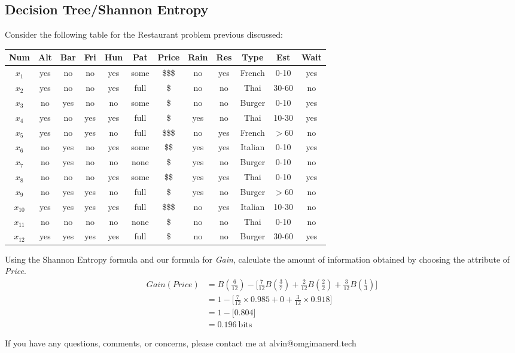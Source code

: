 \documentclass{math}
\begin{document}
\subsection*{Decision Tree/Shannon Entropy}
Consider the following table for the Restaurant problem previous discussed:
\begin{center}
 \begin{tabular}{|c|c|c|c|c|c|c|c|c|c|c||c|}
    \hline
    Num & Alt & Bar & Fri & Hun & Pat & Price & Rain & Res & Type & Est &
      Wait \\ \hline \hline
    \( x_{1} \) & yes & no & no & yes & some & \$\$\$ & no & yes & French &
      0-10 & yes \\ \hline
    \( x_{2} \) & yes & no & no & yes & full & \$ & no & no & Thai & 30-60 &
      no \\ \hline
    \( x_{3} \) & no & yes & no & no & some & \$ & no & no & Burger & 0-10 &
      yes \\ \hline
    \( x_{4} \) & yes & no & yes & yes & full & \$ & yes & no & Thai & 10-30 &
      yes \\ \hline \hline
    \( x_{5} \) & yes & no & yes & no & full & \$\$\$ & no & yes & French &
      $>$60 & no \\ \hline
    \( x_{6} \) & no & yes & no & yes & some & \$\$ & yes & yes & Italian &
      0-10 & yes \\ \hline
    \( x_{7} \) & no & yes & no & no & none & \$ & yes & no & Burger & 0-10 &
      no \\ \hline
    \( x_{8} \) & no & no & no & yes & some & \$\$ & yes & yes & Thai & 0-10 &
      yes \\ \hline \hline
    \( x_{9} \) & no & yes & yes & no & full & \$ & yes & no & Burger & $>$60 &
      no \\ \hline
    \( x_{10} \) & yes & yes & yes & yes & full & \$\$\$ & no & yes & Italian &
      10-30 & no \\ \hline
    \( x_{11} \) & no & no & no & no & none & \$ & no & no & Thai & 0-10 &
      no \\ \hline
    \( x_{12} \) & yes & yes & yes & yes & full & \$ & no & no & Burger &
      30-60 & yes \\ \hline
  \end{tabular}
\end{center}
Using the Shannon Entropy formula and our formula for \textit{Gain}, calculate
the amount of information obtained by choosing the attribute of \textit{Price}.
\begin{align*}
  Gain(Price) &= B(\frac{6}{12})-\bigg[\frac{7}{12}B(\frac{3}{7})+
    \frac{2}{12}B(\frac{2}{2})+\frac{3}{12}B(\frac{1}{3})\bigg] \\
  &= 1-\bigg[\frac{7}{12}\times0.985+0+\frac{3}{12}\times0.918\bigg] \\
  &= 1-\bigg[0.804\bigg] \\
  &= 0.196~\text{bits}
\end{align*}

\begin{center}
  If you have any questions, comments, or concerns, please contact me at
  alvin@omgimanerd.tech
\end{center}
\end{document}
